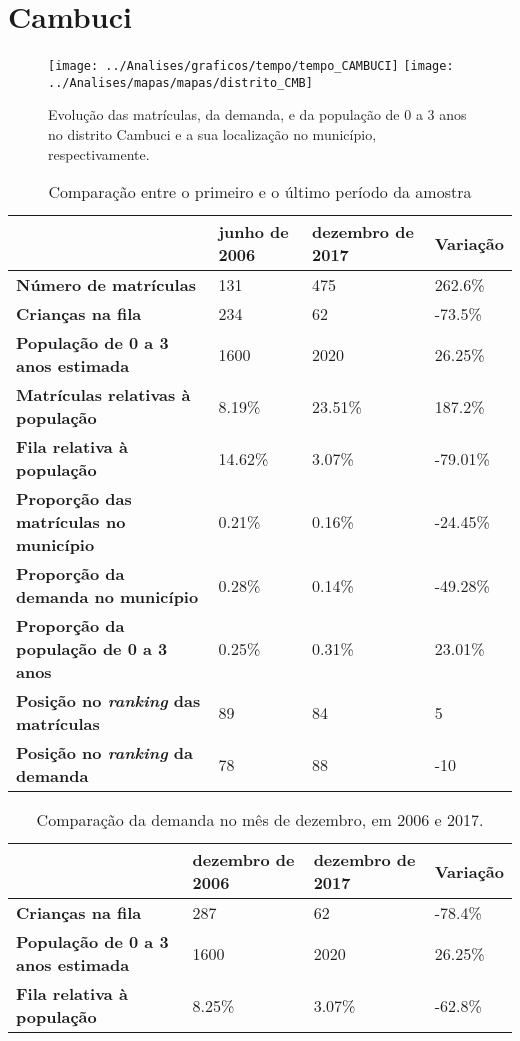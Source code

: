 \section{Cambuci}
\begin{figure}[H]
	\centering
	\texttt{[image: ../Analises/graficos/tempo/tempo\_CAMBUCI]}
	\texttt{[image: ../Analises/mapas/mapas/distrito\_CMB]}
	\caption{Evolução das matrículas, da demanda, e da população de 0 a 3 anos no distrito Cambuci e a sua localização no município, respectivamente.}
\end{figure}
\begin{table}[H]
	\begin{tabular}{|l|l|l|l|}
		\hline
		\textbf{}                                      & \textbf{junho de 2006}       & \textbf{dezembro de 2017}    & \textbf{Variação} \\ \hline
		\textbf{Número de matrículas}                  & 131 & 475 & 262.6\% \\ \hline
		\textbf{Crianças na fila}                      & 234 & 62 & -73.5\% \\ \hline
		\textbf{População de 0 a 3 anos estimada}      & 1600 & 2020 & 26.25\% \\ \hline
		\textbf{Matrículas relativas à população}      & 8.19\% & 23.51\% & 187.2\% \\ \hline
		\textbf{Fila relativa à população}             & 14.62\% & 3.07\% & -79.01\% \\ \hline
		\textbf{Proporção das matrículas no município} & 0.21\% & 0.16\% & -24.45\% \\ \hline
		\textbf{Proporção da demanda no município}     & 0.28\% & 0.14\% & -49.28\% \\ \hline
		\textbf{Proporção da população de 0 a 3 anos}  & 0.25\% & 0.31\% & 23.01\% \\ \hline
		\textbf{Posição no \textit{ranking} das matrículas}     & 89 & 84 & 5 \\ \hline
		\textbf{Posição no \textit{ranking} da demanda}         & 78 & 88 & -10 \\ \hline
	\end{tabular}
	\caption{Comparação entre o primeiro e o último período da amostra}
\end{table}
\begin{table}[H]
	\begin{tabular}{|l|l|l|l|}
		\hline
		\textbf{}                                 & \textbf{dezembro de 2006} & \textbf{dezembro de 2017} & \textbf{Variação} \\ \hline
		\textbf{Crianças na fila}                      & 287 & 62 & -78.4\% \\ \hline
		\textbf{População de 0 a 3 anos estimada}      & 1600 & 2020 & 26.25\% \\ \hline
		\textbf{Fila relativa à população}             & 8.25\% & 3.07\% & -62.8\% \\ \hline
	\end{tabular}
	\caption{Comparação da demanda no mês de dezembro, em 2006 e 2017.}
\end{table}
